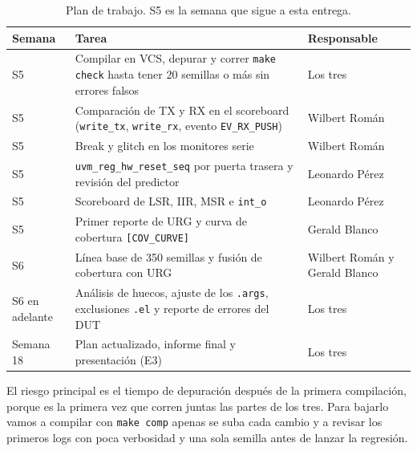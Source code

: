 \documentclass[11pt,letterpaper]{article}
\newcommand{\cod}[1]{\texttt{#1}}
\begin{document}
\begin{table}[h]
\centering\small
\caption{Plan de trabajo. S5 es la semana que sigue a esta entrega.}
\begin{tabularx}{\textwidth}{>{\raggedright\arraybackslash}p{2.1cm} Y >{\raggedright\arraybackslash}p{3.6cm}}
\toprule
Semana & Tarea & Responsable \\
\midrule
S5 & Compilar en VCS, depurar y correr \cod{make check} hasta tener 20 semillas o más sin errores falsos & Los tres \\
S5 & Comparación de TX y RX en el scoreboard (\cod{write\_tx}, \cod{write\_rx}, evento \cod{EV\_RX\_PUSH}) & Wilbert Román \\
S5 & Break y glitch en los monitores serie & Wilbert Román \\
S5 & \cod{uvm\_reg\_hw\_reset\_seq} por puerta trasera y revisión del predictor & Leonardo Pérez \\
S5 & Scoreboard de LSR, IIR, MSR e \cod{int\_o} & Leonardo Pérez \\
S5 & Primer reporte de URG y curva de cobertura \cod{[COV\_CURVE]} & Gerald Blanco \\
S6 & Línea base de 350 semillas y fusión de cobertura con URG & Wilbert Román y Gerald Blanco \\
S6 en adelante & Análisis de huecos, ajuste de los \cod{.args}, exclusiones \cod{.el} y reporte de errores del DUT & Los tres \\
Semana 18 & Plan actualizado, informe final y presentación (E3) & Los tres \\
\bottomrule
\end{tabularx}
\end{table}

El riesgo principal es el tiempo de depuración después de la primera compilación, porque es la primera vez que corren juntas las partes de los tres. Para bajarlo vamos a compilar con \cod{make comp} apenas se suba cada cambio y a revisar los primeros logs con poca verbosidad y una sola semilla antes de lanzar la regresión.
\end{document}
